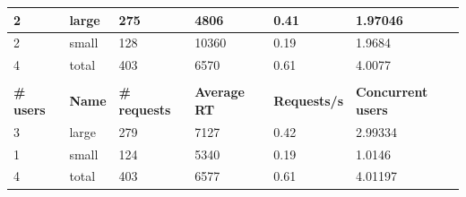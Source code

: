 \begin{table}[H]
\begin{tabular}{llllll}
\multicolumn{1}{|l|}{2}                  & \multicolumn{1}{l|}{large}          & \multicolumn{1}{l|}{275}                  & \multicolumn{1}{l|}{4806}                & \multicolumn{1}{l|}{0.41}                & \multicolumn{1}{l|}{1.97046}                   \\ \hline
\multicolumn{1}{|l|}{2}                  & \multicolumn{1}{l|}{small}        & \multicolumn{1}{l|}{128}                  & \multicolumn{1}{l|}{10360}               & \multicolumn{1}{l|}{0.19}                & \multicolumn{1}{l|}{1.9684}                    \\ \hline
\multicolumn{1}{|l|}{4}                  & \multicolumn{1}{l|}{total}         & \multicolumn{1}{l|}{403}                  & \multicolumn{1}{l|}{6570}                & \multicolumn{1}{l|}{0.61}                & \multicolumn{1}{l|}{4.0077}                    \\ \hline
                                         &                                    &                                           &                                          &                                          &                                                \\ \hline
\multicolumn{1}{|l|}{\textbf{\#  users}} & \multicolumn{1}{l|}{\textbf{Name}} & \multicolumn{1}{l|}{\textbf{\# requests}} & \multicolumn{1}{l|}{\textbf{Average RT}} & \multicolumn{1}{l|}{\textbf{Requests/s}} & \multicolumn{1}{l|}{\textbf{Concurrent users}} \\ \hline
\multicolumn{1}{|l|}{3}                  & \multicolumn{1}{l|}{large}          & \multicolumn{1}{l|}{279}                  & \multicolumn{1}{l|}{7127}                & \multicolumn{1}{l|}{0.42}                & \multicolumn{1}{l|}{2.99334}                   \\ \hline
\multicolumn{1}{|l|}{1}                  & \multicolumn{1}{l|}{small}        & \multicolumn{1}{l|}{124}                  & \multicolumn{1}{l|}{5340}                & \multicolumn{1}{l|}{0.19}                & \multicolumn{1}{l|}{1.0146}                    \\ \hline
\multicolumn{1}{|l|}{4}                  & \multicolumn{1}{l|}{total}         & \multicolumn{1}{l|}{403}                  & \multicolumn{1}{l|}{6577}                & \multicolumn{1}{l|}{0.61}                & \multicolumn{1}{l|}{4.01197}                   \\ \hline
\end{tabular}
\end{table}


